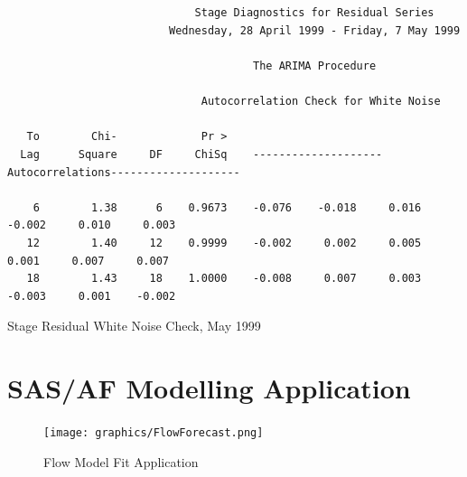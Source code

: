 \documentclass[12pt]{report}
\begin{document}
\begin{table} \scriptsize
\begin{centering}
\begin{verbatim}


                             Stage Diagnostics for Residual Series
                         Wednesday, 28 April 1999 - Friday, 7 May 1999

                                      The ARIMA Procedure

                              Autocorrelation Check for White Noise

   To        Chi-             Pr >
  Lag      Square     DF     ChiSq    --------------------Autocorrelations--------------------

    6        1.38      6    0.9673    -0.076    -0.018     0.016    -0.002     0.010     0.003
   12        1.40     12    0.9999    -0.002     0.002     0.005     0.001     0.007     0.007
   18        1.43     18    1.0000    -0.008     0.007     0.003    -0.003     0.001    -0.002

\end{verbatim}
\end{centering}\normalsize\caption{Stage Residual White Noise Check, May 1999}
\end{table}


\chapter{SAS/AF Modelling Application}

\begin{figure}[h]\label{fig:SASAF}
\centering\texttt{[image: graphics/FlowForecast.png]}
\caption{Flow Model Fit Application}
\end{figure}\clearpage
\end{document}
